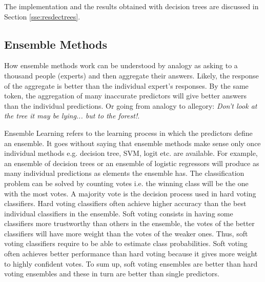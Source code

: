 \documentclass[11pt]{article}
\theoremstyle{definition}
\theoremstyle{remark}
\begin{document}
The implementation and the results obtained with decision trees are discussed in Section \ref{sse:resdectrees}.

\subsection{Ensemble Methods}
\label{sse:ensemble}
How ensemble methods work can be understood by analogy as asking to a thousand people (experts) and then aggregate their answers. Likely, the response of the aggregate is better than the individual expert's responses. By the same token, the aggregation of many inaccurate predictors will give better answers than the individual predictions. Or going from analogy to allegory: \emph{Don't look at the tree it may be lying... but to the forest!}. 

Ensemble Learning refers to the learning process in which the predictors define an ensemble. It goes without saying that ensemble methods make sense only once individual methods e.g. decision tree, SVM, logit etc. are available. For example, an ensemble of decision trees or an ensemble of logistic regressors will produce as many individual predictions as elements the ensemble has. The classification problem can be solved by counting votes i.e. the winning class will be the one with the most votes. A majority vote is the decision process used in hard voting classifiers. Hard voting classifiers often achieve higher accuracy than the best individual classifiers in the ensemble. 
Soft voting consists in having some classifiers more trustworthy than others in the ensemble, the votes of the better classifiers will have more weight than the votes of the weaker ones. Thus, soft voting classifiers require to be able to estimate class probabilities.
Soft voting often achieves better performance than hard voting because it gives more weight to highly confident votes. To sum up, soft voting ensembles are better than hard voting ensembles and these in turn are better than single predictors.
\end{document}
